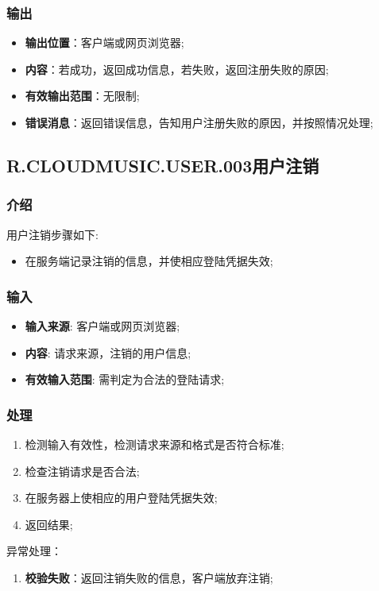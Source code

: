 \subsubsection{输出}
\begin{itemize}
	\item \textbf{输出位置}：客户端或网页浏览器;
	\item \textbf{内容}：若成功，返回成功信息，若失败，返回注册失败的原因;
	\item \textbf{有效输出范围}：无限制;
	\item \textbf{错误消息}：返回错误信息，告知用户注册失败的原因，并按照情况处理;
\end{itemize}

\subsection{R.CLOUDMUSIC.USER.003用户注销}
\subsubsection{介绍}
用户注销步骤如下:
	\begin{itemize}
		\item 在服务端记录注销的信息，并使相应登陆凭据失效;
	\end{itemize}
\subsubsection{输入}
	\begin{itemize}
		\item \textbf{输入来源}: 客户端或网页浏览器;
		\item \textbf{内容}: 请求来源，注销的用户信息;
		\item \textbf{有效输入范围}: 需判定为合法的登陆请求;
	\end{itemize}
\subsubsection{处理}
	\begin{enumerate}
		\item 检测输入有效性，检测请求来源和格式是否符合标准;
		\item 检查注销请求是否合法;
		\item 在服务器上使相应的用户登陆凭据失效;
		\item 返回结果;
	\end{enumerate}
	\noindent 异常处理：
	\begin{enumerate}
		\item \textbf{校验失败}：返回注销失败的信息，客户端放弃注销;
	\end{enumerate}
